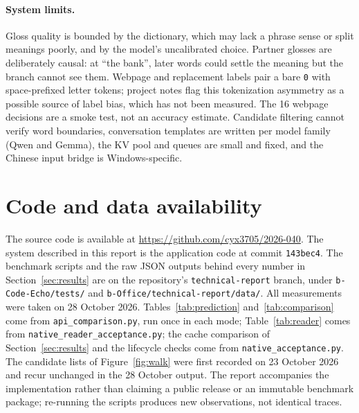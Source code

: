 \documentclass[11pt,a4paper]{article}
\newcommand{\code}[1]{\texttt{#1}}
\begin{document}
\paragraph{System limits.} Gloss quality is bounded by the dictionary, which may lack a phrase sense or split meanings poorly, and by the model's uncalibrated choice. Partner glosses are deliberately causal: at ``the bank'', later words could settle the meaning but the branch cannot see them. Webpage and replacement labels pair a bare \code{0} with space-prefixed letter tokens; project notes flag this tokenization asymmetry as a possible source of label bias, which has not been measured. The 16 webpage decisions are a smoke test, not an accuracy estimate. Candidate filtering cannot verify word boundaries, conversation templates are written per model family (Qwen and Gemma), the KV pool and queues are small and fixed, and the Chinese input bridge is Windows-specific.

\section{Code and data availability}
\label{sec:reproduction}
The source code is available at \url{https://github.com/cyx3705/2026-040}. The system described in this report is the application code at commit \code{143bec4}. The benchmark scripts and the raw JSON outputs behind every number in Section~\ref{sec:results} are on the repository's \code{technical-report} branch, under \code{b-Code-Echo/tests/} and \code{b-Office/technical-report/data/}. All measurements were taken on 28 October 2026. Tables~\ref{tab:prediction} and~\ref{tab:comparison} come from \code{api\_comparison.py}, run once in each mode; Table~\ref{tab:reader} comes from \code{native\_reader\_acceptance.py}; the cache comparison of Section~\ref{sec:results} and the lifecycle checks come from \code{native\_acceptance.py}. The candidate lists of Figure~\ref{fig:walk} were first recorded on 23 October 2026 and recur unchanged in the 28 October output. The report accompanies the implementation rather than claiming a public release or an immutable benchmark package; re-running the scripts produces new observations, not identical traces.
\end{document}
